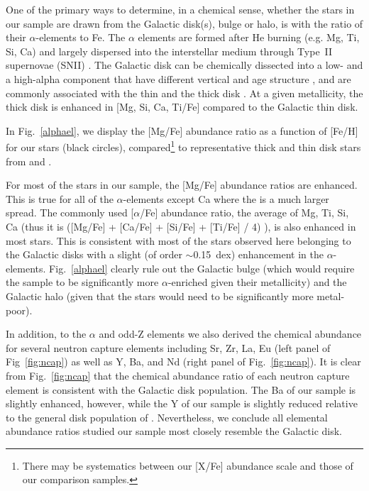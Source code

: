 \documentclass[modern]{aastex62}
\begin{document}
One of the primary ways to determine, in a chemical sense, whether the stars in our sample are drawn from the Galactic disk(s), bulge or halo, is with the ratio of their $\alpha$-elements to Fe. The $\alpha$ elements are formed after He burning (e.g. Mg, Ti, Si, Ca) and largely dispersed into the interstellar medium through Type~II supernovae (SNII) \citep{Matteucci2001}. %
The Galactic disk can be chemically dissected into a low- and a high-alpha component that have different vertical and age structure \citep[see e.g.][]{2016ApJ...823...30B,2017A&A...608L...1H,2018MNRAS.475.5487S}, and are commonly associated with the thin and the thick disk \citep[e.g.][and references therein]{Edvardsson1993, Adibekyan2012, Feltzing2013, Bensby2014}. At a given metallicity, the thick disk is enhanced in [Mg, Si, Ca, Ti/Fe] compared to the Galactic thin disk.

In Fig.~\ref{alphael}, we display the [Mg/Fe] abundance ratio as a function of [Fe/H] for our stars (black circles), compared\footnote{There may be systematics between our [X/Fe] abundance scale and those of our comparison samples.} to representative thick and thin disk stars from \cite[open red squares]{Bensby2014} and \cite[open blue triangles]{Adibekyan2012}. 

For most of the stars in our sample, the [Mg/Fe] abundance ratios are enhanced. This is true for all of the $\alpha$-elements except Ca where the is a much larger spread. The commonly used [$\alpha$/Fe] abundance ratio, the average of Mg, Ti, Si, Ca (thus it is ([Mg/Fe] + [Ca/Fe] + [Si/Fe] + [Ti/Fe] / 4) ), is also enhanced in most stars. This is consistent with most of the stars observed here belonging to the Galactic disks with a slight (of order $\sim$0.15~dex) enhancement in the $\alpha$-elements. Fig.~\ref{alphael} clearly rule out the Galactic bulge (which would require the sample to be significantly more $\alpha$-enriched given their metallicity) and the Galactic halo (given that the stars would need to be significantly more metal-poor). %

In addition, to the $\alpha$ and odd-Z elements we also derived the chemical abundance for several neutron capture elements including Sr, Zr, La, Eu (left panel of Fig~\ref{fig:ncap}) as well as Y, Ba, and Nd (right panel of Fig.~\ref{fig:ncap}).  It is clear from Fig.~\ref{fig:ncap}  that the chemical abundance ratio of each neutron capture element is consistent with the Galactic disk population. The Ba of our sample is slightly enhanced, however, while the Y of our sample is slightly reduced relative to the general disk population of \cite{Bensby2014}. Nevertheless, we conclude all elemental abundance ratios studied our sample most closely resemble the Galactic disk. 
\end{document}
